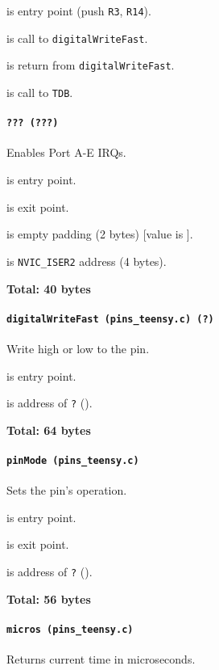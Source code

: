  is entry point (push \texttt{R3}, \texttt{R14}).

 is call to \texttt{digitalWriteFast}.

 is return from \texttt{digitalWriteFast}.

 is call to \texttt{TDB}.

\paragraph{\texttt{??? (???)}} Enables Port A-E IRQs.

 is entry point.

 is exit point.

 is empty padding (2 bytes) [value is ].

 is \texttt{NVIC\_ISER2} address (4 bytes).

\textbf{Total: 40 bytes}

\paragraph{\texttt{digitalWriteFast (pins\_teensy.c) (?)}} Write high or low to the
pin.

 is entry point.

 is address of \texttt{?} ().

\textbf{Total: 64 bytes}

\paragraph{\texttt{pinMode (pins\_teensy.c)}} Sets the pin's operation.

 is entry point.

 is exit point.

 is address of \texttt{?} ().

\textbf{Total: 56 bytes}

\paragraph{\texttt{micros (pins\_teensy.c)}} Returns current time in
microseconds.

